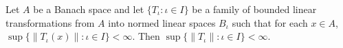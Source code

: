 Let $A$ be a Banach space and let $\{T_{\iota} : \iota \in I\}$ be a family of bounded linear transformations from $A$ into normed linear spaces $B_{\iota}$ such that for each $x \in A$, $\sup\{\|T_{\iota}(x)\| : \iota \in I\} < \infty$. Then $\sup\{\|T_{\iota}\| : \iota \in I\} < \infty$.
